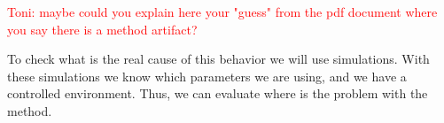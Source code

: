 \textcolor{red}{Toni: maybe could you explain here your "guess" from the pdf
document where you say there is a method artifact?}

To check what is the real cause of this behavior we will use simulations.
With these simulations we know which parameters we are using, and we have a
controlled environment. Thus, we can evaluate where is the problem with the
method.